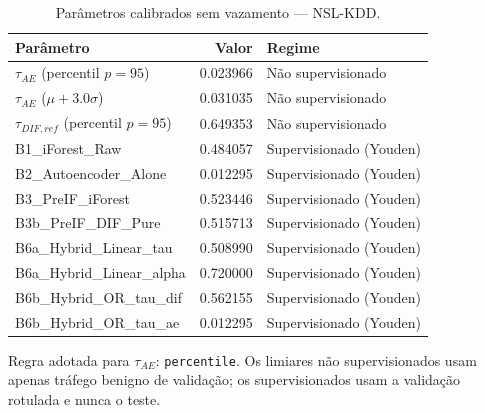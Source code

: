 \begin{table}[htbp]
\centering
\caption{Parâmetros calibrados sem vazamento — NSL-KDD.}
\label{tab:calibracao-nsl-kdd}
\small
\begin{tabular}{lrl}
\hline
Parâmetro & Valor & Regime \\
\hline
$\tau_{AE}$ (percentil $p=95$) & 0.023966 & Não supervisionado \\
$\tau_{AE}$ ($\mu + 3.0\sigma$) & 0.031035 & Não supervisionado \\
$\tau_{DIF,ref}$ (percentil $p=95$) & 0.649353 & Não supervisionado \\
B1\_iForest\_Raw & 0.484057 & Supervisionado (Youden) \\
B2\_Autoencoder\_Alone & 0.012295 & Supervisionado (Youden) \\
B3\_PreIF\_iForest & 0.523446 & Supervisionado (Youden) \\
B3b\_PreIF\_DIF\_Pure & 0.515713 & Supervisionado (Youden) \\
B6a\_Hybrid\_Linear\_tau & 0.508990 & Supervisionado (Youden) \\
B6a\_Hybrid\_Linear\_alpha & 0.720000 & Supervisionado (Youden) \\
B6b\_Hybrid\_OR\_tau\_dif & 0.562155 & Supervisionado (Youden) \\
B6b\_Hybrid\_OR\_tau\_ae & 0.012295 & Supervisionado (Youden) \\
\hline
\end{tabular}
\begin{flushleft}\footnotesize Regra adotada para $\tau_{AE}$: \texttt{percentile}. Os limiares não supervisionados usam apenas tráfego benigno de validação; os supervisionados usam a validação rotulada e nunca o teste.\end{flushleft}
\end{table}
